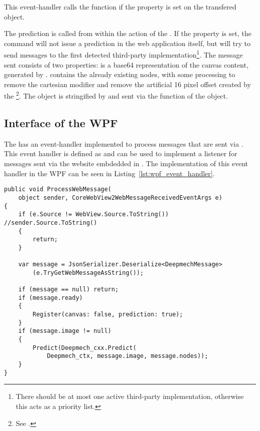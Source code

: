 This event-handler calls the  function if the  property is set on the transfered object.

The prediction is called from within the  action of the .
If the  property is set, the  command will not issue a prediction in the web application itself, but will try to send messages to the first detected third-party implementation\footnote{There should be at most one active third-party implementation, otherwise this acts as a priority list.}.
The message sent consists of two properties:
 is a base64 representation of the canvas content, generated by .
 contains the already existing nodes, with some processing to remove the cartesian modifier and remove the artificial 16 pixel offset created by the \footnote{See .}.
The object is stringified by  and sent via the  function of the  object.

\subsection{Interface of the WPF}

The  has an event-handler implemented to process messages that are sent via .
This event handler is defined as  and can be used to implement a listener for messages sent via the website embdedded in .
The implementation of this event handler in the WPF can be seen in Listing~\ref{lst:wpf_event_handler}.

\begin{lstlisting}[label={lst:wpf_event_handler}, caption={Event handler of the WPF-application}]
public void ProcessWebMessage(
    object sender, CoreWebView2WebMessageReceivedEventArgs e)
{
    if (e.Source != WebView.Source.ToString()) //sender.Source.ToString()
    {
        return;
    }

    var message = JsonSerializer.Deserialize<DeepmechMessage>
        (e.TryGetWebMessageAsString());

    if (message == null) return;
    if (message.ready)
    {
        Register(canvas: false, prediction: true);
    }
    if (message.image != null)
    {
        Predict(Deepmech_cxx.Predict(
            Deepmech_ctx, message.image, message.nodes));
    }
}
\end{lstlisting}

